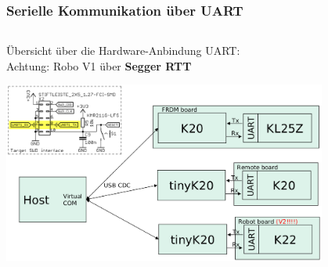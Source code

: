 
\begin{frame}
  \frametitle{Serielle Kommunikation über UART}
	    \begin{column}{1\linewidth}
	    	Übersicht über die Hardware-Anbindung UART:\\
	    	Achtung: Robo V1 über \textbf{Segger RTT}
	    	\begin{center}
	    		\includegraphics[width=0.8\textwidth]{images/UART_HW_Mapping.png}
	    	\end{center}
	    \end{column}
\end{frame}

